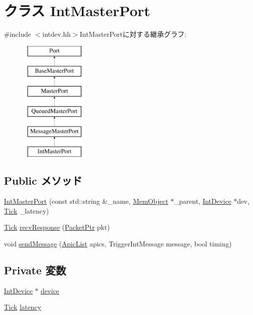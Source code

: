 \hypertarget{classX86ISA_1_1IntDevice_1_1IntMasterPort}{
\section{クラス IntMasterPort}
\label{classX86ISA_1_1IntDevice_1_1IntMasterPort}
}


{\ttfamily \#include $<$intdev.hh$>$}IntMasterPortに対する継承グラフ:\begin{figure}[H]
\begin{center}
\leavevmode
\includegraphics[height=6cm]{classX86ISA_1_1IntDevice_1_1IntMasterPort}
\end{center}
\end{figure}
\subsection*{Public メソッド}
\begin{DoxyCompactItemize}
\item 
\hyperlink{classX86ISA_1_1IntDevice_1_1IntMasterPort_afa923acbe92fee643145777cd0d319ec}{IntMasterPort} (const std::string \&\_\-name, \hyperlink{classMemObject}{MemObject} $\ast$\_\-parent, \hyperlink{classX86ISA_1_1IntDevice}{IntDevice} $\ast$dev, \hyperlink{base_2types_8hh_a5c8ed81b7d238c9083e1037ba6d61643}{Tick} \_\-latency)
\item 
\hyperlink{base_2types_8hh_a5c8ed81b7d238c9083e1037ba6d61643}{Tick} \hyperlink{classX86ISA_1_1IntDevice_1_1IntMasterPort_a96d1a00beed669f9145d55bc3675d99c}{recvResponse} (\hyperlink{classPacket}{PacketPtr} pkt)
\item 
void \hyperlink{classX86ISA_1_1IntDevice_1_1IntMasterPort_aa8849259721c2101686b45b59b587253}{sendMessage} (\hyperlink{classstd_1_1list}{ApicList} apics, TriggerIntMessage message, bool timing)
\end{DoxyCompactItemize}
\subsection*{Private 変数}
\begin{DoxyCompactItemize}
\item 
\hyperlink{classX86ISA_1_1IntDevice}{IntDevice} $\ast$ \hyperlink{classX86ISA_1_1IntDevice_1_1IntMasterPort_a213401fbaf58b821f38f6e274ddafadc}{device}
\item 
\hyperlink{base_2types_8hh_a5c8ed81b7d238c9083e1037ba6d61643}{Tick} \hyperlink{classX86ISA_1_1IntDevice_1_1IntMasterPort_ac8d8966078cc047949fd1bca8feb21b6}{latency}
\end{DoxyCompactItemize}



